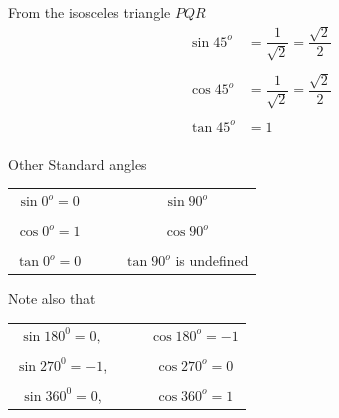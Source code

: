 \documentclass[11pt,a4paper]{article}
\begin{document}
From the  isosceles triangle $PQR$ 
\begin{align*}
\sin 45^o & = \dfrac{1}{\sqrt{2}} = \dfrac{\sqrt{2}}{2}\\\\
\cos 45^o & = \dfrac{1}{\sqrt{2}} = \dfrac{\sqrt{2}}{2}\\\\
\tan 45^o & = 1\\
\end{align*}





Other Standard angles\\
\begin{table}[H]
\begin{tabular}{cccc}
$\sin 0^o = 0$ &&& $\sin 90^o$\\
&&&\\
$\cos 0^o = 1$ &&& $\cos 90^o$\\
&&&\\
$\tan 0^o = 0$ &&& $\tan 90^o$ is undefined\\
\end{tabular}
\end{table}
\vspace{1.4cm}









Note also that 
\begin{table}[H]
\begin{tabular}{cccc}
$\sin 180^0 = 0,$ &&& $\cos 180^o = -1$\\
&&&\\
$\sin 270^0 = -1$, &&& $\cos 270^o = 0$\\
&&&\\
$\sin 360^0 = 0$, &&& $\cos 360^o = 1$\\
\end{tabular}
\end{table}
\vspace{1.5cm}
\end{document}

